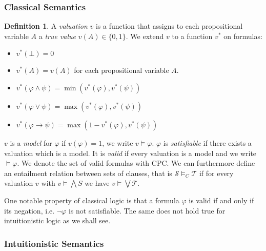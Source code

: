 \documentclass[a4paper,12pt]{report}
\theoremstyle{definition}
\theoremstyle{definition}
\theoremstyle{definition}
\theoremstyle{definition}
\theoremstyle{definition}
\newtheorem{definition}[theorem]{Definition}
\theoremstyle{definition}
\theoremstyle{definition}
\begin{document}
	\subsubsection{Classical Semantics}
	
	\begin{definition}
		A \textit{valuation} $v$ is a function that assigns to each propositional variable $A$ a \textit{true value} $v(A)\in\{0, 1\}$. We extend $v$ to a function $v^*$ on formulas:
		\begin{itemize}
			\item $v^*(\bot) = 0$
			\item $v^*(A) = v(A)$ for each propositional variable $A$.
			\item $v^*(\varphi\wedge\psi) = \min(v^*(\varphi), v^*(\psi))$
			\item $v^*(\varphi\vee\psi) = \max(v^*(\varphi), v^*(\psi))$
			\item $v^*(\varphi\to \psi) = \max(1 - v^*(\varphi), v^*(\psi))$
		\end{itemize}
		$v$ is a \textit{model} for $\varphi$ if $v(\varphi) = 1$, we write $v\models\varphi$. $\varphi$ is \textit{satisfiable} if there exists a valuation which is a model. It is \textit{valid} if every valuation is a model and we write $\models \varphi$. We denote the set of valid formulas with CPC. We can furthermore define an entailment relation between sets of clauses, that is $\mathcal S\models_C \mathcal T$ if for every valuation $v$ with $v\models\bigwedge S$ we have $v\models\bigvee \mathcal T$.
	\end{definition}
	
	One notable property of classical logic is that a formula $\varphi$ is valid if and only if its negation, i.e. $\neg\varphi$ is not satisfiable. The same does not hold true for intuitionistic logic as we shall see.

	\subsubsection{Intuitionistic Semantics}
	
\end{document}
